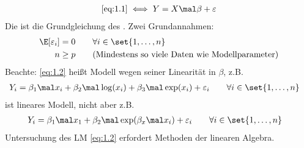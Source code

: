 \begin{align}\label{eq:1.2}%
	\eqref{eq:1.1}
	\iff 
	Y=X\mal\beta+\varepsilon
\end{align}
Die ist die Grundgleichung des .
Zwei Grundannahmen:
\begin{align}\label{eq:1.3}
	\E[\varepsilon_i]&=0\qquad\forall i\in\set{1,\ldots,n}\\
	n&\geq p\qquad\text{(Mindestens so viele Daten wie Modellparameter)}
	\label{eq:1.4}
\end{align}
Beachte: \eqref{eq:1.2} heißt  Modell wegen seiner Linearität in $\beta$, z.B. 
\begin{align*}
	Y_i&=\beta_1\mal x_i+\beta_2\mal\log(x_i)+\beta_3\mal\exp(x_i)+\varepsilon_i
	\qquad\forall i\in\set{1,\ldots,n}
\end{align*}
ist lineares Modell, nicht aber z.B.
\begin{align*}
	Y_i&=\beta_1\mal x_1+\beta_2\mal\exp(\beta_x\mal x_i)+\varepsilon_i
	\qquad\forall i\in\set{1,\ldots,n}
\end{align*}
Untersuchung des LM \eqref{eq:1.2} erfordert Methoden der linearen Algebra.
